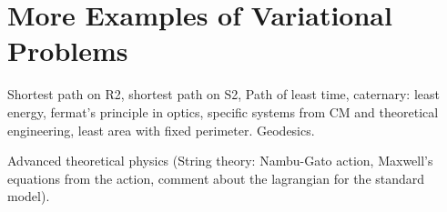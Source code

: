 \section{More Examples of Variational Problems}
Shortest path on R2, shortest path on S2, Path of least time, caternary: least energy, fermat's principle in optics, specific systems from CM and theoretical engineering, least area with fixed perimeter. Geodesics.

Advanced theoretical physics (String theory: Nambu-Gato action, Maxwell's equations from the action, comment about the lagrangian for the standard model).